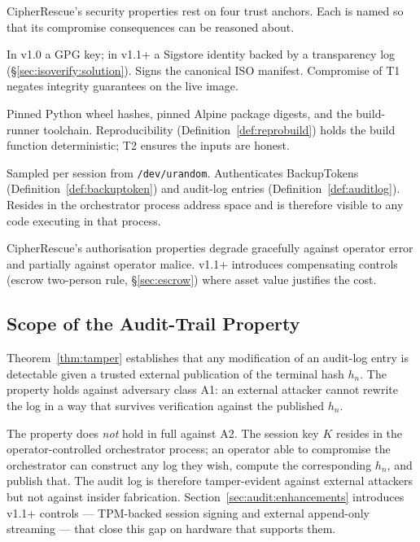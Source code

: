 \documentclass[11pt,a4paper]{report}
\begin{document}
CipherRescue's security properties rest on four trust anchors. Each is named so that its compromise consequences can be reasoned about.

\begin{description}[noitemsep]
  \item[\textbf{T1 --- The release signing identity.}] In v1.0 a GPG key; in v1.1+ a Sigstore identity backed by a transparency log (\S\ref{sec:isoverify:solution}). Signs the canonical ISO manifest. Compromise of T1 negates integrity guarantees on the live image.
  \item[\textbf{T2 --- The reproducible-build inputs.}] Pinned Python wheel hashes, pinned Alpine package digests, and the build-runner toolchain. Reproducibility (Definition~\ref{def:reprobuild}) holds the build function deterministic; T2 ensures the inputs are honest.
  \item[\textbf{T3 --- The session key $K$.}] Sampled per session from \texttt{/dev/urandom}. Authenticates BackupTokens (Definition~\ref{def:backuptoken}) and audit-log entries (Definition~\ref{def:auditlog}). Resides in the orchestrator process address space and is therefore visible to any code executing in that process.
  \item[\textbf{T4 --- Operator procedural compliance.}] CipherRescue's authorisation properties degrade gracefully against operator error and partially against operator malice. v1.1+ introduces compensating controls (escrow two-person rule, \S\ref{sec:escrow}) where asset value justifies the cost.
\end{description}

\subsection{Scope of the Audit-Trail Property}
\label{sec:auditscope}

Theorem~\ref{thm:tamper} establishes that any modification of an audit-log entry is detectable given a trusted external publication of the terminal hash $h_n$. The property holds against adversary class A1: an external attacker cannot rewrite the log in a way that survives verification against the published $h_n$.

The property does \emph{not} hold in full against A2. The session key $K$ resides in the operator-controlled orchestrator process; an operator able to compromise the orchestrator can construct any log they wish, compute the corresponding $h_n$, and publish that. The audit log is therefore tamper-evident against external attackers but not against insider fabrication. Section~\ref{sec:audit:enhancements} introduces v1.1+ controls --- TPM-backed session signing and external append-only streaming --- that close this gap on hardware that supports them.
\end{document}
